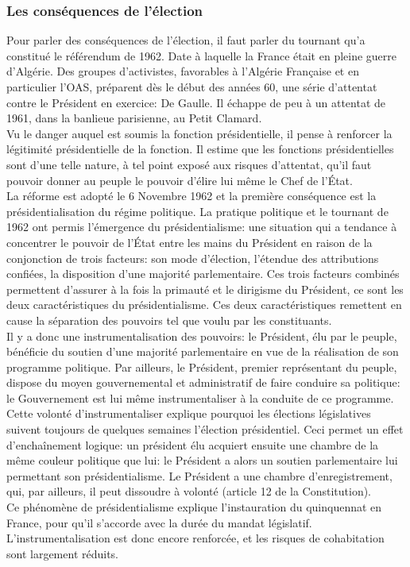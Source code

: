 \documentclass[12pt, a4paper, openany]{book}
\begin{document}
\subsubsection{Les conséquences de l'élection}

Pour parler des conséquences de l'élection, il faut parler du tournant qu'a constitué le référendum de 1962. Date à laquelle la France était en pleine guerre d'Algérie. Des groupes d'activistes, favorables à l'Algérie Française et en particulier l'OAS, préparent dès le début des années 60, une série d'attentat contre le Président en exercice: De Gaulle. Il échappe de peu à un attentat de 1961, dans la banlieue parisienne, au Petit Clamard. \\
Vu le danger auquel est soumis la fonction présidentielle, il pense à renforcer la légitimité présidentielle de la fonction. Il estime que les fonctions présidentielles sont d'une telle nature, à tel point exposé aux risques d'attentat, qu'il faut pouvoir donner au peuple le pouvoir d'élire lui même le Chef de l'État. \\
La réforme est adopté le 6 Novembre 1962 et la première conséquence est la présidentialisation du régime politique. La pratique politique et le tournant de 1962 ont permis l'émergence du présidentialisme: une situation qui a tendance à concentrer le pouvoir de l'État entre les mains du Président en raison de la conjonction de trois facteurs: son mode d'élection, l'étendue des attributions confiées, la disposition d'une majorité parlementaire. Ces trois facteurs combinés permettent d'assurer à la fois la primauté et le dirigisme du Président, ce sont les deux caractéristiques du présidentialisme. Ces deux caractéristiques remettent en cause la séparation des pouvoirs tel que voulu par les constituants. \\
Il y a donc une instrumentalisation des pouvoirs: le Président, élu par le peuple, bénéficie du soutien d'une majorité parlementaire en vue de la réalisation de son programme politique. Par ailleurs, le Président, premier représentant du peuple, dispose du moyen gouvernemental et administratif de faire conduire sa politique: le Gouvernement est lui même instrumentaliser à la conduite de ce programme. Cette volonté d'instrumentaliser explique pourquoi les élections législatives suivent toujours de quelques semaines l'élection présidentiel. Ceci permet un effet d'enchaînement logique: un président élu acquiert ensuite une chambre de la même couleur politique que lui: le Président a alors un soutien parlementaire lui permettant son présidentialisme. Le Président a une chambre d'enregistrement, qui, par ailleurs, il peut dissoudre à volonté (article 12 de la Constitution). \\
Ce phénomène de présidentialisme explique l'instauration du quinquennat en France, pour qu'il s'accorde avec la durée du mandat législatif. L'instrumentalisation est donc encore renforcée, et les risques de cohabitation sont largement réduits.
\end{document}
